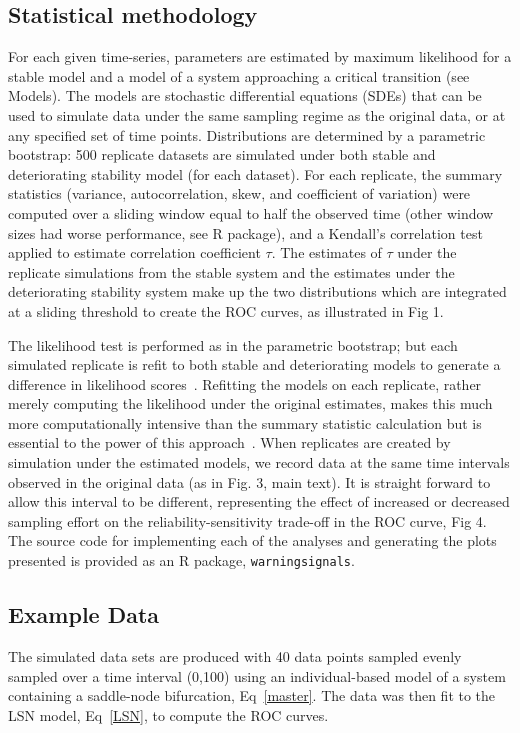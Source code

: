 \documentclass[authoryear,preprint,11pt]{elsarticle}
\begin{document}
\subsection{Statistical methodology}
For each given time-series, parameters are estimated by maximum likelihood 
for a stable model and a model of a system approaching a critical transition (see Models).
The models are stochastic differential equations (SDEs)
that can be used to simulate data under the same sampling regime as the original data, 
or at any specified set of time points.
Distributions are determined by a parametric bootstrap:
500 replicate datasets are simulated under both stable and deteriorating stability model (for each dataset).
For each replicate, the summary statistics (variance, autocorrelation, skew, and coefficient of variation)
were computed over a sliding window equal to half the observed time (other window sizes had worse performance, see R package), 
and a Kendall's correlation test applied to estimate correlation coefficient $\tau$.
The estimates of $\tau$ under the replicate simulations from the stable system
and the estimates under the deteriorating stability system
make up the two distributions which are integrated at a sliding threshold to create the ROC curves, as illustrated in Fig 1. 

The likelihood test is performed as in the parametric bootstrap; 
but each simulated replicate is refit to both stable and deteriorating models to generate a difference in likelihood scores~\citep{Cox1961}.
Refitting the models on each replicate, 
rather merely computing the likelihood under the original estimates,
makes this much more computationally intensive than the summary statistic calculation but is essential to the power of this approach~\citep{Huelsenbeck1996}.
When replicates are created by simulation under the estimated models,
we record data at the same time intervals observed in the original data (as in Fig. 3, main text). 
It is straight forward to allow this interval to be different,
representing the effect of increased or decreased sampling effort on the reliability-sensitivity trade-off in the ROC curve, Fig 4.
The source code for implementing each of the analyses and generating the plots presented is provided as an R package, \verb|warningsignals|. 

\subsection{Example Data}
The simulated data sets are produced with 40 data points
sampled evenly sampled over a time interval (0,100) using an individual-based model of a system containing a saddle-node bifurcation, Eq~\eqref{master}.
The data was then fit to the LSN model, Eq~\eqref{LSN}, to compute the ROC curves. 
\end{document}
